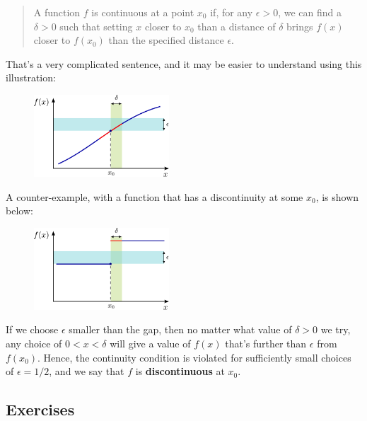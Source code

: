 \documentclass[10pt,a4paper]{article}
\begin{document}
\begin{quote}
A function $f$ is continuous at a point $x_0$ if, for any
$\epsilon > 0$, we can find a $\delta > 0$ such that setting $x$
closer to $x_0$ than a distance of $\delta$ brings $f(x)$ closer
to $f(x_0)$ than the specified distance $\epsilon$.
\end{quote}

\noindent
That's a very complicated sentence, and it may be easier to understand
using this illustration:

\begin{figure}[ht]
  \centering\includegraphics[width=0.45\textwidth]{continuity}
\end{figure}

\noindent
A counter-example, with a function that has a discontinuity at some
$x_0$, is shown below:

\begin{figure}[ht]
  \centering\includegraphics[width=0.45\textwidth]{discontinuity}
\end{figure}

\noindent
If we choose $\epsilon$ smaller than the gap, then no matter what
value of $\delta > 0$ we try, any choice of $0 < x < \delta$ will give
a value of $f(x)$ that's further than $\epsilon$ from $f(x_0)$. Hence,
the continuity condition is violated for sufficiently small choices of
$\epsilon = 1/2$, and we say that $f$ is \textbf{discontinuous} at
$x_0$.

\subsection{Exercises}\label{exercises}
\end{document}
